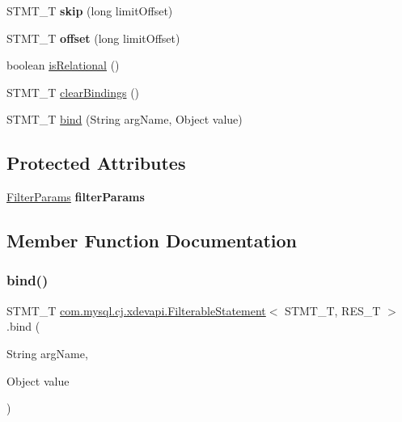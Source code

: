 \begin{DoxyCompactItemize}
S\+T\+M\+T\+\_\+T {\bfseries skip} (long limit\+Offset)
\item 
\mbox{\label{classcom_1_1mysql_1_1cj_1_1xdevapi_1_1_filterable_statement_a6ca59bb68ddc2a7900137900cdb219c8}} 
S\+T\+M\+T\+\_\+T {\bfseries offset} (long limit\+Offset)
\item 
boolean \mbox{\hyperlink{classcom_1_1mysql_1_1cj_1_1xdevapi_1_1_filterable_statement_a0fc92f86e2ee374cbf5c7fe66d7c7dea}{is\+Relational}} ()
\item 
S\+T\+M\+T\+\_\+T \mbox{\hyperlink{classcom_1_1mysql_1_1cj_1_1xdevapi_1_1_filterable_statement_a6f81659cd181c72dea83972c18438f56}{clear\+Bindings}} ()
\item 
S\+T\+M\+T\+\_\+T \mbox{\hyperlink{classcom_1_1mysql_1_1cj_1_1xdevapi_1_1_filterable_statement_af9ccf97ebcaf88f6f9317829bf8496cb}{bind}} (String arg\+Name, Object value)
\end{DoxyCompactItemize}
\subsection*{Protected Attributes}
\begin{DoxyCompactItemize}
\item 
\mbox{\label{classcom_1_1mysql_1_1cj_1_1xdevapi_1_1_filterable_statement_a0004223ee831ad799fd8c17dec2dc7f9}} 
\mbox{\hyperlink{classcom_1_1mysql_1_1cj_1_1xdevapi_1_1_filter_params}{Filter\+Params}} {\bfseries filter\+Params}
\end{DoxyCompactItemize}


\subsection{Member Function Documentation}
\mbox{\label{classcom_1_1mysql_1_1cj_1_1xdevapi_1_1_filterable_statement_af9ccf97ebcaf88f6f9317829bf8496cb}} 
\subsubsection{\texorpdfstring{bind()}{bind()}}
{\footnotesize\ttfamily S\+T\+M\+T\+\_\+T \mbox{\hyperlink{classcom_1_1mysql_1_1cj_1_1xdevapi_1_1_filterable_statement}{com.\+mysql.\+cj.\+xdevapi.\+Filterable\+Statement}}$<$ S\+T\+M\+T\+\_\+T, R\+E\+S\+\_\+T $>$.bind (\begin{DoxyParamCaption}\item[{String}]{arg\+Name,  }\item[{Object}]{value }\end{DoxyParamCaption})}

